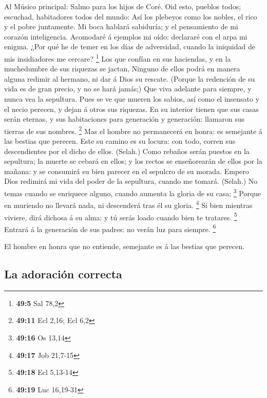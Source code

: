  Al Músico principal: Salmo para los hijos de Coré. Oid
esto, pueblos todos; escuchad, habitadores todos del mundo: 
Así los plebeyos como los nobles, el rico y el pobre juntamente.
 Mi boca hablará sabiduría; y el pensamiento de mi corazón
inteligencia.  Acomodaré á ejemplos mi oído: declararé con
el arpa mi enigma.  ¿Por qué he de temer en los días de
adversidad, cuando la iniquidad de mis insidiadores me cercare?
\footnote{\textbf{49:5} Sal 78,2}  Los que confían en sus
haciendas, y en la muchedumbre de sus riquezas se jactan, 
Ninguno de ellos podrá en manera alguna redimir al hermano, ni dar á
Dios su rescate.  (Porque la redención de su vida es de gran
precio, y no se hará jamás;)  Que viva adelante para
siempre, y nunca vea la sepultura.  Pues se ve que mueren
los sabios, así como el insensato y el necio perecen, y dejan á otros
sus riquezas.  En su interior tienen que sus casas serán
eternas, y sus habitaciones para generación y generación: llamaron sus
tierras de sus nombres. \footnote{\textbf{49:11} Ecl 2,16; Ecl 6,2}
 Mas el hombre no permanecerá en honra: es semejante á las
bestias que perecen.  Este su camino es su locura: con
todo, corren sus descendientes por el dicho de ellos. (Selah.)
 Como rebaños serán puestos en la sepultura; la muerte se
cebará en ellos; y los rectos se enseñorearán de ellos por la mañana: y
se consumirá su bien parecer en el sepulcro de su morada. 
Empero Dios redimirá mi vida del poder de la sepultura, cuando me
tomará. (Selah.)  No temas cuando se enriquece alguno,
cuando aumenta la gloria de su casa; \footnote{\textbf{49:16} Os 13,14}
 Porque en muriendo no llevará nada, ni descenderá tras él
su gloria. \footnote{\textbf{49:17} Job 21,7-15}  Si bien
mientras viviere, dirá dichosa á su alma: y tú serás loado cuando bien
te tratares. \footnote{\textbf{49:18} Ecl 5,13-14}  Entrará
á la generación de sus padres: no verán luz para siempre. \footnote{\textbf{49:19}
  Luc 16,19-31}

 El hombre en honra que no entiende, semejante es á las
bestias que perecen.

\hypertarget{la-adoraciuxf3n-correcta}{%
\subsection{La adoración correcta}\label{la-adoraciuxf3n-correcta}}

